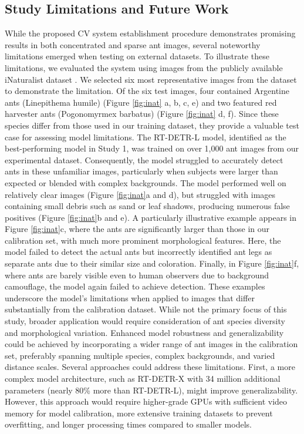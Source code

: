 \subsection{Study Limitations and Future Work}

While the proposed CV system establishment procedure demonstrates promising results in both concentrated and sparse ant images, several noteworthy limitations emerged when testing on external datasets. To illustrate these limitations, we evaluated the system using images from the publicly available iNaturalist dataset \cite{horn_inaturalist_2018}. We selected six most representative images from the dataset to demonstrate the limitation. Of the six test images, four contained Argentine ants (Linepithema humile) (Figure \ref{fig:inat} a, b, c, e) and two featured red harvester ants (Pogonomyrmex barbatus) (Figure \ref{fig:inat} d, f). Since these species differ from those used in our training dataset, they provide a valuable test case for assessing model limitations.
The RT-DETR-L model, identified as the best-performing model in Study 1, was trained on over 1,000 ant images from our experimental dataset. Consequently, the model struggled to accurately detect ants in these unfamiliar images, particularly when subjects were larger than expected or blended with complex backgrounds. The model performed well on relatively clear images (Figure \ref{fig:inat}a and d), but struggled with images containing small debris such as sand or leaf shadows, producing numerous false positives (Figure \ref{fig:inat}b and e). A particularly illustrative example appears in Figure \ref{fig:inat}c, where the ants are significantly larger than those in our calibration set, with much more prominent morphological features. Here, the model failed to detect the actual ants but incorrectly identified ant legs as separate ants due to their similar size and coloration. Finally, in Figure \ref{fig:inat}f, where ants are barely visible even to human observers due to background camouflage, the model again failed to achieve detection.
These examples underscore the model's limitations when applied to images that differ substantially from the calibration dataset. While not the primary focus of this study, broader application would require consideration of ant species diversity and morphological variation. Enhanced model robustness and generalizability could be achieved by incorporating a wider range of ant images in the calibration set, preferably spanning multiple species, complex backgrounds, and varied distance scales.
Several approaches could address these limitations. First, a more complex model architecture, such as RT-DETR-X with 34 million additional parameters (nearly 80\% more than RT-DETR-L), might improve generalizability. However, this approach would require higher-grade GPUs with sufficient video memory for model calibration, more extensive training datasets to prevent overfitting, and longer processing times compared to smaller models.
